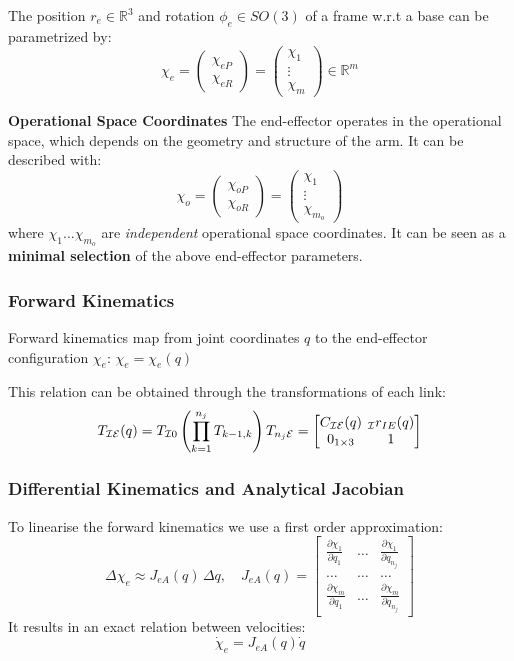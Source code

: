 \documentclass[fontsize=6pt,DIV=calc,a4paper,ngerman]{scrartcl}
\begin{document}
\begin{multicols*}{4}
	The position $r_e\in \mathbb{R}^3$ and rotation $\phi_e \in SO(3)$ of a frame w.r.t a base can be parametrized by:
	$$\chi_e = \begin{pmatrix}\chi_{eP} \\ \chi_{eR}\end{pmatrix} = \left(\begin{smallmatrix}\chi_{1} \\\vdots \\\chi_{m}\end{smallmatrix}\right)\in \mathbb{R}^m$$

	\textbf{Operational Space Coordinates}
	The end-effector operates in the operational space, which depends on the geometry and structure of the arm. It can be described with:
	$$\chi_o = \begin{pmatrix}\chi_{oP} \\ \chi_{oR}\end{pmatrix}=\left(\begin{smallmatrix}\chi_{1} \\\vdots \\\chi_{m_o}\end{smallmatrix}\right)$$
	where $\chi_1 \dots \chi_{m_o}$  are \textit{independent} operational space coordinates. It can be seen as a \textbf{minimal selection} of the above end-effector parameters.

	\subsubsection{Forward Kinematics}
	Forward kinematics map from joint coordinates $q$ to the end-effector configuration $\chi_e$: \quad $\chi_e = \chi_e(q)$

	This relation can be obtained through the transformations of each link:\\
	$$ T_\mathcal{IE}(q)=T_{\mathcal{I}0} \left(\prod_{k=1}^{n_j}T_{k-1,k}\right)T_{n_j\mathcal{E}}=
		\setlength\arraycolsep{2pt}
		\begin{bmatrix}
			C_\mathcal{IE}(q) & {}_\mathcal{I}r_{IE}(q) \\
			0_{1\times 3}     & 1
		\end{bmatrix}$$

	\subsubsection{Differential Kinematics and Analytical Jacobian}
	To linearise the forward kinematics we use a first order approximation:
	$$\Delta \chi_e \approx J_{eA}(q)\, \Delta q, \quad J_{eA}(q)=
		\left[\begin{smallmatrix}
				\frac{\partial \chi_1}{\partial q_1} & \dots & \frac{\partial \chi_1}{\partial q_{n_j}}\\
				\dots & \dots & \dots \\
				\frac{\partial \chi_m}{\partial q_1} & \dots  & \frac{\partial \chi_m}{\partial q_{n_j}}
			\end{smallmatrix}\right]$$
	It results in an exact relation between velocities:
	$$\dot{\chi}_e =J_{eA}(q)\dot{q}$$


\end{multicols*}
\end{document}
